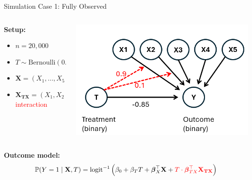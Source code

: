 \documentclass[onlytextwidth,english]{beamer}\usepackage[]{graphicx}\usepackage[]{xcolor}
\begin{document}
\begin{frame}{Simulation Case 1: Fully Observed}

\begin{columns}

\begin{column}{0.52\textwidth}

\vspace{-0.5em}
\textbf{Setup:}
\begin{itemize}\setlength\itemsep{0.4em}
  \item $n = 20{,}000$
  \item $T \sim \text{Bernoulli}(0.5)$
  \item $\mathbf{X} = (X_1, \dots, X_5)^\top \sim \mathcal{N}(\mathbf{0}, \Sigma)$\\
  \item $\mathbf{X_{TX}} = (X_1, X_2)^\top$ \textcolor{red}{interaction}
\end{itemize}


\end{column}

\begin{column}{0.42\textwidth}
    \includegraphics[width=\textwidth]{img/simulation_observed.png}
\end{column}

\end{columns}


\vspace{0.3em}
\textbf{Outcome model:}
\[
\mathbb{P}(Y = 1 \mid \mathbf{X}, T) = \text{logit}^{-1} \left(
\beta_0 + \beta_T T + \boldsymbol{\beta}_X^\top \mathbf{X}
+ \textcolor{red}{T \cdot \boldsymbol{\beta}_{TX}^\top \mathbf{X_{TX}}}
\right)
\]


\end{frame}
\end{document}
